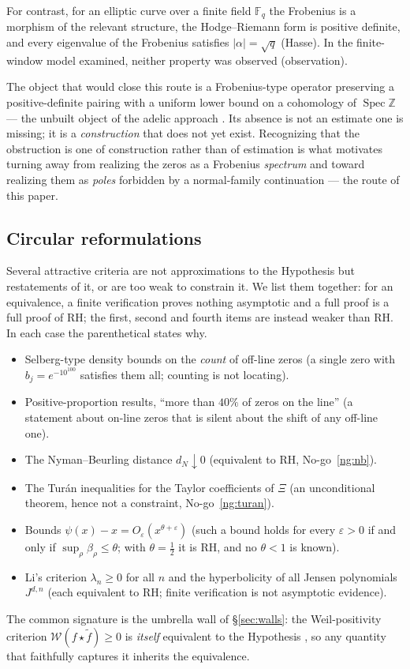 \documentclass[11pt]{amsart}
\theoremstyle{definition}
\theoremstyle{remark}
\theoremstyle{definition}
\newcommand{\Spec}{\operatorname{Spec}}
\newcommand{\cW}{\mathcal{W}}
\begin{document}
For contrast, for an elliptic curve over a finite field $\mathbb F_q$ the Frobenius is a morphism of the
relevant structure, the Hodge--Riemann form is positive definite, and every eigenvalue of the Frobenius
satisfies $|\alpha|=\sqrt q$ (Hasse). In the finite-window model examined, neither property was
observed (observation).

The object that would close this route is a Frobenius-type operator preserving a
positive-definite pairing with a uniform lower bound on a cohomology of $\Spec\mathbb Z$ --- the unbuilt object of the adelic
approach \cite{connesconsani-site}. Its absence is not an estimate one is missing; it is a
\emph{construction} that does not yet exist. Recognizing that the obstruction is one of construction
rather than of estimation is what motivates turning away from realizing the zeros as a Frobenius
\emph{spectrum} and toward realizing them as \emph{poles} forbidden by a normal-family continuation ---
the route of this paper.

\subsection{Circular reformulations}\label{sec:circular}

Several attractive criteria are not approximations to the Hypothesis but restatements of it, or are too
weak to constrain it. We list them together: for an equivalence, a finite verification proves nothing
asymptotic and a full proof is a full proof of RH; the first, second and fourth items are instead weaker
than RH. In each case the parenthetical states why.

\begin{itemize}[leftmargin=1.6em]
\item Selberg-type density bounds on the \emph{count} of off-line zeros (a single zero with $b_j=e^{-10^{100}}$
satisfies them all; counting is not locating).
\item Positive-proportion results, ``more than $40\%$ of zeros on the line'' \cite{Levinson,Conrey1989} (a statement
about on-line zeros that is silent about the shift of any off-line one).
\item The Nyman--Beurling distance $d_N\downarrow0$ \cite{Beurling,BaezDuarte} (equivalent to RH, No-go~\ref{ng:nb}).
\item The Tur\'an inequalities for the Taylor coefficients of $\Xi$ (an unconditional theorem, hence not a
constraint, No-go~\ref{ng:turan}).
\item Bounds $\psi(x)-x=O_\varepsilon(x^{\theta+\varepsilon})$ (such a bound holds for every $\varepsilon>0$ if and only if $\sup_\rho\beta_\rho\le\theta$; with $\theta=\tfrac12$ it is RH, and no $\theta<1$ is known).
\item Li's criterion $\lambda_n\ge0$ for all $n$ and the hyperbolicity of all Jensen polynomials $J^{d,n}$
\cite{Li,GORZ} (each equivalent to RH; finite verification is not asymptotic evidence).
\end{itemize}
\noindent The common signature is the umbrella wall of \S\ref{sec:walls}: the Weil-positivity criterion
$\cW(f\star\tilde f)\ge0$ is \emph{itself} equivalent to the Hypothesis \cite{Weil1952}, so any quantity that
faithfully captures it inherits the equivalence.
\end{document}
